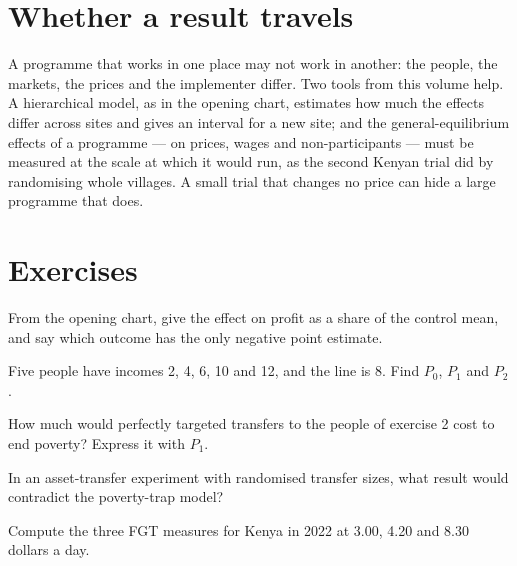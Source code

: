 \section{Whether a result travels}\label{sec:b3:development-microeconomics:travels}

A programme that works in one place may not work in another: the people, the
markets, the prices and the implementer differ. Two tools from this volume help. A
hierarchical model, as in the opening chart, estimates how much the effects differ
across sites and gives an interval for a new site; and the general-equilibrium
effects of a programme --- on prices, wages and non-participants --- must be
measured at the scale at which it would run, as the second Kenyan trial did by
randomising whole villages. A small trial that changes no price can hide a large
programme that does.

\section{Exercises}\label{sec:b3:development-microeconomics:exercises}

\begin{exercise}[$\star$]\label{exo:b3:development-microeconomics:1}
From the opening chart, give the effect on profit as a share of the control mean, and
say which outcome has the only negative point estimate.
\end{exercise}

\begin{exercise}[$\star$]\label{exo:b3:development-microeconomics:2}
Five people have incomes 2, 4, 6, 10 and 12, and the line is 8. Find $P_0$, $P_1$ and $P_2$.
\end{exercise}

\begin{exercise}[$\star$]\label{exo:b3:development-microeconomics:3}
How much would perfectly targeted transfers to the people of exercise 2 cost to end
poverty? Express it with $P_1$.
\end{exercise}

\begin{exercise}[$\star$]\label{exo:b3:development-microeconomics:4}
In an asset-transfer experiment with randomised transfer sizes, what result would
contradict the poverty-trap model?
\end{exercise}

\begin{exercise}[$\star\star$]\label{exo:b3:development-microeconomics:5}
Compute the three FGT measures for Kenya in 2022 at 3.00, 4.20 and 8.30 dollars a day.
\end{exercise}

